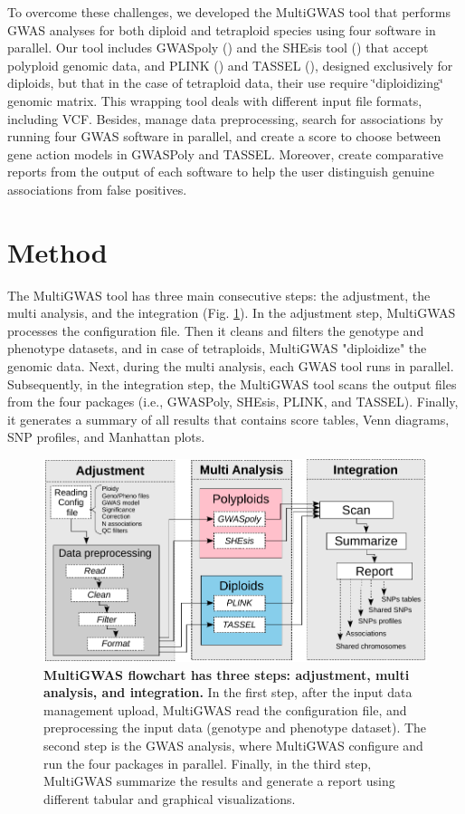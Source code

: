 \documentclass{article}
\begin{document}
To overcome these challenges, we developed the MultiGWAS tool that performs GWAS analyses for both diploid and tetraploid species using four software in parallel. Our tool includes GWASpoly (\cite{Rosyara2016}) and the SHEsis tool (\cite{Shen2016}) that accept polyploid genomic data, and PLINK (\cite{Purcell2007}) and TASSEL (\cite{Bradbury2007}), designed exclusively for diploids, but that in the case of tetraploid data, their use require \char`\"{}diploidizing\char`\"{} genomic matrix. This wrapping tool deals with different input file formats, including VCF. Besides, manage data preprocessing, search for associations by running four GWAS software in parallel, and create a score to choose between gene action models in GWASPoly and TASSEL. Moreover, create comparative reports from the output of each software to help the user distinguish genuine associations from false positives.




\section{Method}

The MultiGWAS tool has three main consecutive steps: the adjustment, the multi analysis, and the integration (Fig. \ref{fig: Pipeline}). In the adjustment step, MultiGWAS processes the configuration file. Then it cleans and filters the genotype and phenotype datasets, and in case of tetraploids,  MultiGWAS "diploidize" the genomic data. Next, during the multi analysis, each GWAS tool runs in parallel. Subsequently, in the integration step, the MultiGWAS tool scans the output files from the four packages (i.e., GWASPoly, SHEsis, PLINK, and TASSEL). Finally, it generates a summary of all results that contains score tables, Venn diagrams, SNP profiles, and Manhattan plots. 
\begin{figure}
\centering{}\includegraphics[width=12cm]{images/paper-multiGWAS-flowchart-stages} \caption{\textbf{MultiGWAS flowchart has three steps: adjustment, multi analysis, and integration.} In the first step, after the input data management upload, MultiGWAS read the configuration file, and preprocessing the input data (genotype and phenotype dataset). The second step is the GWAS analysis, where MultiGWAS configure and run the four packages in parallel. Finally, in the third step, MultiGWAS summarize the results and generate a report using different tabular and graphical visualizations.\label{fig: Pipeline}}
\end{figure}
\end{document}
